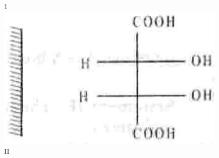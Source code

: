 \documentclass[10pt]{article}
\begin{document}
1\\
\includegraphics[max width=\textwidth, center]{2025_01_28_8470952b98110cec3aabg-147}\\
II
\end{document}
